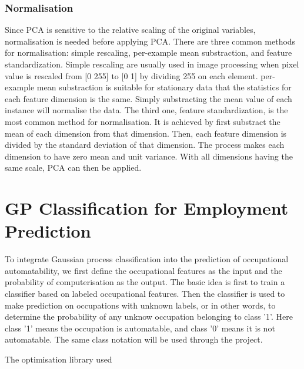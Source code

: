 \documentclass[11pt]{report}
\numberwithin{equation}{chapter}
\begin{document}
\begin{spacing}{2}
\subsection{Normalisation}
Since PCA is sensitive to the relative scaling of the original variables, normalisation\cite{kotsiantis2006data} is needed before applying PCA\cite{PCA_AN}. There are three common methods for normalisation: simple rescaling, per-example mean substraction, and feature standardization. Simple rescaling are usually used in image processing when pixel value is rescaled from [0 255] to [0 1] by dividing 255 on each element. per-example mean substraction is suitable for stationary data that the statistics for each feature dimension is the same. Simply substracting the mean value of each instance will normalise the data. The third one, feature standardization, is the most common method for normalisation. It is achieved by first substract the mean of each dimension from that dimension. Then, each feature dimension is divided by the standard deviation of that dimension. The process makes each dimension to have zero mean and unit variance. With all dimensions having the same scale, PCA can then be applied.



\chapter{GP Classification for Employment Prediction}
\label{GP_for_employment}
To integrate Gaussian process classification into the prediction of occupational automatability, we first define the occupational features as the input and the probability of computerisation as the output. The basic idea is first to train a classifier based on labeled occupational features. Then the classifier is used to make prediction on occupations with unknown labels, or in other words, to determine the probability of any unknow occupation belonging to class '1'. Here class '1' means the occupation is automatable, and class '0' means it is not automatable. The same class notation will be used through the project.  

The optimisation library used   


\end{spacing}
\end{document}
